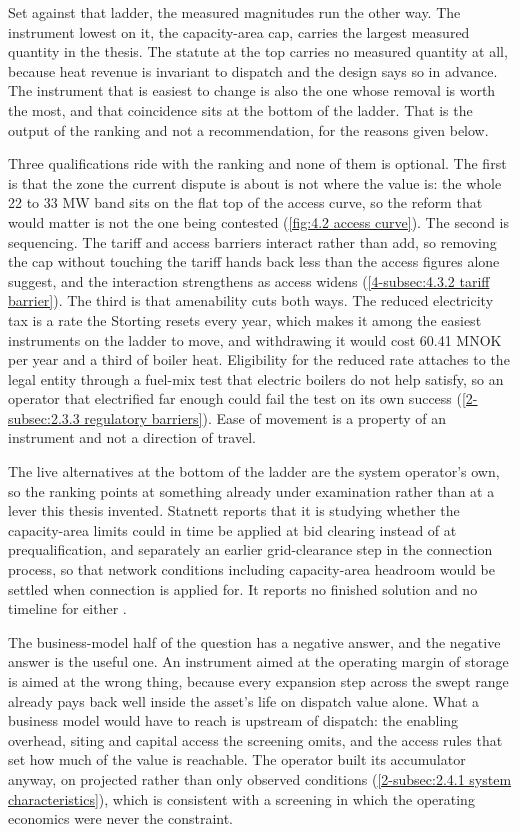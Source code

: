 Set against that ladder, the measured magnitudes run the other way. The instrument lowest on it, the capacity-area cap, carries the largest measured quantity in the thesis. The statute at the top carries no measured quantity at all, because heat revenue is invariant to dispatch and the design says so in advance. The instrument that is easiest to change is also the one whose removal is worth the most, and that coincidence sits at the bottom of the ladder. That is the output of the ranking and not a recommendation, for the reasons given below.

Three qualifications ride with the ranking and none of them is optional. The first is that the zone the current dispute is about is not where the value is: the whole 22 to 33 MW band sits on the flat top of the access curve, so the reform that would matter is not the one being contested (\autoref{fig:4.2 access curve}). The second is sequencing. The tariff and access barriers interact rather than add, so removing the cap without touching the tariff hands back less than the access figures alone suggest, and the interaction strengthens as access widens (\autoref{4-subsec:4.3.2 tariff barrier}). The third is that amenability cuts both ways. The reduced electricity tax is a rate the Storting resets every year, which makes it among the easiest instruments on the ladder to move, and withdrawing it would cost 60.41 MNOK per year and a third of boiler heat. Eligibility for the reduced rate attaches to the legal entity through a fuel-mix test that electric boilers do not help satisfy, so an operator that electrified far enough could fail the test on its own success (\autoref{2-subsec:2.3.3 regulatory barriers}). Ease of movement is a property of an instrument and not a direction of travel.

The live alternatives at the bottom of the ladder are the system operator's own, so the ranking points at something already under examination rather than at a lever this thesis invented. Statnett reports that it is studying whether the capacity-area limits could in time be applied at bid clearing instead of at prequalification, and separately an earlier grid-clearance step in the connection process, so that network conditions including capacity-area headroom would be settled when connection is applied for. It reports no finished solution and no timeline for either \cite{statnett_sporsmal_2026}.

The business-model half of the question has a negative answer, and the negative answer is the useful one. An instrument aimed at the operating margin of storage is aimed at the wrong thing, because every expansion step across the swept range already pays back well inside the asset's life on dispatch value alone. What a business model would have to reach is upstream of dispatch: the enabling overhead, siting and capital access the screening omits, and the access rules that set how much of the value is reachable. The operator built its accumulator anyway, on projected rather than only observed conditions (\autoref{2-subsec:2.4.1 system characteristics}), which is consistent with a screening in which the operating economics were never the constraint.

